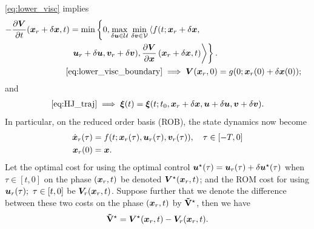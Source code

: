 %
\eqref{eq:lower_visc} implies 
%
\begin{align}
	\begin{split}
		-\frac{\partial \valuefunc}{\partial t}(\state_r + \delta \state, t)
		&= 
		\min \left\{0,  
		\max_{\delta \control \in \mathcal{U}} \, \min_{\delta \disturb \in \mathcal{V}} \left\langle f(t; \state_r + \delta \state, \right. \right. \\
		&  \left. \left.  \control_r + \delta \control, \disturb_r + \delta \disturb), \dfrac{\partial \valuefunc}{\partial \state}\left(\state_r + \delta \state, t \right) \right\rangle \right\}. 
	\end{split} \nonumber \\
	\eqref{eq:lower_visc_boundary} \implies	\valuefunc(\state_r, 0) &= g(0; \state_r(0) + \delta \state (0));
	\label{eq:canonical_value}
\end{align}
%
and
%
\begin{align}
	\eqref{eq:HJ_traj} \implies	\bm{\xi}(t) = \bm{\xi}(t; t_0, \bm{x}_r + \delta\bm{x}, 	\bm{u}+\delta\bm{u},\bm{v}+\delta\bm{v}).
\end{align}
%
In particular, on the reduced order basis (ROB), the state dynamics now become
%
\begin{subequations}
	\begin{align}
		\dot{\bm{x}}_r(\tau) &= f(t; \bm{x}_r(\tau), \bm{u}_r(\tau), \bm{v}_r(\tau)), \quad \tau \in \left[-T, 0\right] \\
		\bm{x}_r(0) &= \bm{x}.
	\end{align}
\end{subequations}
%
Let the optimal cost  for using the optimal control $\bm{u}^\star(\tau) = \bm{u}_r(\tau) + \delta \bm{u}^\star(\tau)$ when $\tau \in \left[t, 0\right]$ on the phase $(\bm{x}_r, t)$ be denoted $\bm{V}^\star(\bm{x}_r, t)$; and the ROM cost for using $\bm{u}_r(\tau); \,\, \tau \in \left[t, 0\right]$ be $\bm{V}_r(\bm{x}_r, t)$. Suppose further that we denote  the difference between these two costs on the phase $\left(\bm{x}_r, t\right)$ by $\mathbf{\tilde{V}}^\star$, then we have
%
\begin{align}
	\costdiff^\star =\valuefunc^\star(\state_r, t) -\valuefunc_r(\state_r, t).
	\label{eq:cost_diff}
\end{align}
%
